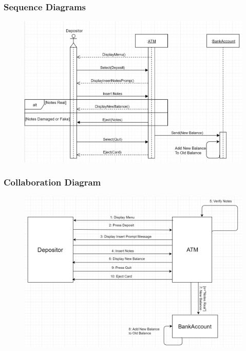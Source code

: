 \documentclass{article}
\begin{document}
		\newpage\subsubsection{Sequence Diagrams}
		\begin{figure}[h!]
		  \includegraphics[width=\linewidth]{img/deposit_sequence.png}
		\end{figure}

		\newpage\subsubsection{Collaboration Diagram}	
		\begin{figure}[h!]
		  \includegraphics[width=\linewidth]{img/deposit_collaboration.png}
		\end{figure}
\end{document}
